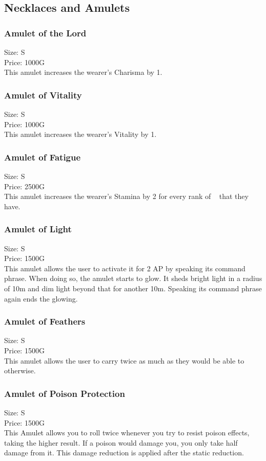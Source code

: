 \subsection{Necklaces and Amulets}\label{subsec:amulets}

\subsubsection{Amulet of the Lord}\label{item:amuletOfLord}
Size: S\\
Price: 1000G\\
This amulet increases the wearer's Charisma by 1.

\subsubsection{Amulet of Vitality}\label{item:amuletOfVitality}
Size: S\\
Price: 1000G\\
This amulet increases the wearer's Vitality by 1.

\subsubsection{Amulet of Fatigue}\label{item:amuletOfFatigue}
Size: S\\
Price: 2500G\\
This amulet increases the wearer's Stamina by 2 for every rank of ~ that they have.

\subsubsection{Amulet of Light}\label{item:amuletOfLight}
Size: S\\
Price: 1500G\\
This amulet allows the user to activate it for 2 AP by speaking its command phrase.
When doing so, the amulet starts to glow.
It sheds bright light in a radius of 10m and dim light beyond that for another 10m.
Speaking its command phrase again ends the glowing.

\subsubsection{Amulet of Feathers}\label{item:amuletOfFeathers}
Size: S\\
Price: 1500G\\
This amulet allows the user to carry twice as much as they would be able to otherwise.

\subsubsection{Amulet of Poison Protection}\label{item:amuletOfAntidote}
Size: S\\
Price: 1500G\\
This Amulet allows you to roll twice whenever you try to resist poison effects, taking the higher result.
If a poison would damage you, you only take half damage from it.
This damage reduction is applied after the static reduction.
